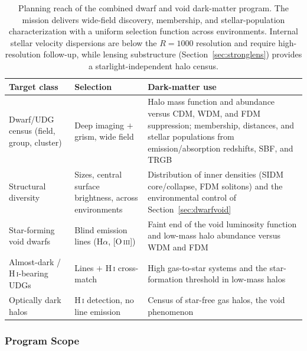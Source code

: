 \documentclass[10pt,onecolumn]{article}
\begin{document}
\begin{table}[tp]
\centering
\sffamily\small
\begin{tabularx}{\textwidth}{@{}p{3.4cm}p{3.6cm}X@{}}
\toprule
\textbf{Target class} & \textbf{Selection} & \textbf{Dark-matter use}\\
\midrule
Dwarf/UDG census (field, group, cluster) & Deep imaging $+$ grism, wide field & Halo mass function and abundance versus CDM, WDM, and FDM suppression; membership, distances, and stellar populations from emission/absorption redshifts, SBF, and TRGB\\
Structural diversity & Sizes, central surface brightness, across environments & Distribution of inner densities (SIDM core/collapse, FDM solitons) and the environmental control of Section~\ref{sec:dwarfvoid}\\
Star-forming void dwarfs & Blind emission lines (H$\alpha$, [O\,\textsc{iii}]) & Faint end of the void luminosity function and low-mass halo abundance versus WDM and FDM\\
Almost-dark / H\,\textsc{i}-bearing UDGs & Lines $+$ H\,\textsc{i} cross-match & High gas-to-star systems and the star-formation threshold in low-mass halos\\
Optically dark halos & H\,\textsc{i} detection, no line emission & Census of star-free gas halos, the void phenomenon\\
\bottomrule
\end{tabularx}
\caption{Planning reach of the combined dwarf and void dark-matter program. The mission delivers wide-field discovery, membership, and stellar-population characterization with a uniform selection function across environments. Internal stellar velocity dispersions are below the $R=1000$ resolution and require high-resolution follow-up, while lensing substructure (Section~\ref{sec:stronglens}) provides a starlight-independent halo census.}
\label{tab:dwarfvoidreach}
\end{table}

\subsubsection{Program Scope}
\end{document}
